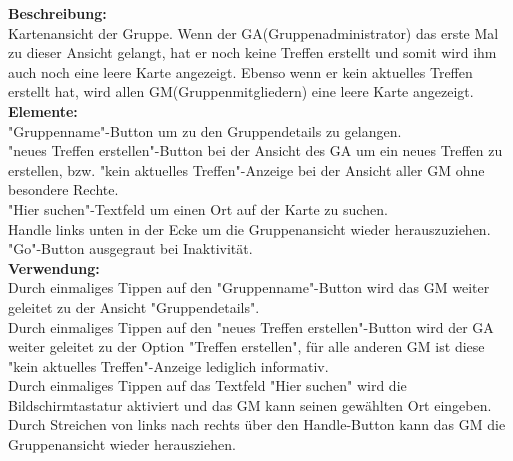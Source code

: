 \textbf{Beschreibung:}\\
Kartenansicht der Gruppe. Wenn der GA(Gruppenadministrator) das erste Mal zu dieser Ansicht gelangt, hat er noch keine Treffen erstellt und somit wird ihm auch noch eine leere Karte angezeigt. Ebenso wenn er kein aktuelles Treffen erstellt hat, wird allen GM(Gruppenmitgliedern) eine leere Karte angezeigt.\\
\textbf{Elemente:}\\
"Gruppenname"-Button um zu den Gruppendetails zu gelangen.\\
"neues Treffen erstellen"-Button bei der Ansicht des GA um ein neues Treffen zu erstellen, bzw. "kein aktuelles Treffen"-Anzeige bei der Ansicht aller GM ohne besondere Rechte.\\
"Hier suchen"-Textfeld um einen Ort auf der Karte zu suchen.\\
Handle links unten in der Ecke um die Gruppenansicht wieder herauszuziehen.\\
"Go"-Button ausgegraut bei Inaktivität.\\
\textbf{Verwendung:}\\
Durch einmaliges Tippen auf den "Gruppenname"-Button wird das GM weiter geleitet zu der Ansicht "Gruppendetails".\\
Durch einmaliges Tippen auf den "neues Treffen erstellen"-Button wird der GA weiter geleitet zu der Option "Treffen erstellen", für alle anderen GM ist diese "kein aktuelles Treffen"-Anzeige lediglich informativ.\\
Durch einmaliges Tippen auf das Textfeld "Hier suchen" wird die Bildschirmtastatur aktiviert und das GM kann seinen gewählten Ort eingeben.\\
Durch Streichen von links nach rechts über den Handle-Button kann das GM die Gruppenansicht wieder herausziehen.
\clearpage
\newpage

